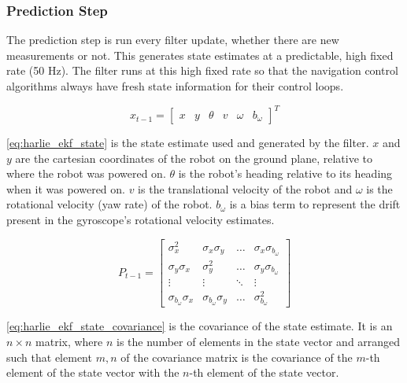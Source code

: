 \subsubsection{Prediction Step}\label{subsubsec:harlie_ekf_prediction}

The prediction step is run every filter update, whether there are new measurements or not. This generates state estimates at a predictable, high fixed rate (50 Hz). The filter runs at this high fixed rate so that the navigation control algorithms always have fresh state information for their control loops.

\begin{equation}
	x_{t-1} = 
	\begin{bmatrix}
		x &
		y &
		\theta &
		v &
		\omega &
		b_{\omega}
	\end{bmatrix}^T
	\label{eq:harlie_ekf_state}
\end{equation}

\eqref{eq:harlie_ekf_state} is the state estimate used and generated by the filter. $x$ and $y$ are the cartesian coordinates of the robot on the ground plane, relative to where the robot was powered on. $\theta$ is the robot's heading relative to its heading when it was powered on. $v$ is the translational velocity of the robot and $\omega$ is the rotational velocity (yaw rate) of the robot. $b_{\omega}$ is a bias term to represent the drift present in the gyroscope's rotational velocity estimates.

\begin{equation}
	P_{t-1} =
	\begin{bmatrix}
		\sigma_x^2 & \sigma_x\sigma_y & \ldots & \sigma_x\sigma_{b_{\omega}} \\
		\sigma_y\sigma_x & \sigma_y^2 & \ldots & \sigma_y\sigma_{b_{\omega}} \\
		\vdots & \vdots & \ddots & \vdots \\
		\sigma_{b_{\omega}}\sigma_x & \sigma_{b_{\omega}}\sigma_y & 
			\ldots & \sigma_{b_{\omega}}^2
	\end{bmatrix}
	\label{eq:harlie_ekf_state_covariance}
\end{equation}

\eqref{eq:harlie_ekf_state_covariance} is the covariance of the state estimate. It is an $n\times n$ matrix, where $n$ is the number of elements in the state vector and arranged such that element $m,n$ of the covariance matrix is the covariance of the $m$-th element of the state vector with the $n$-th element of the state vector.

